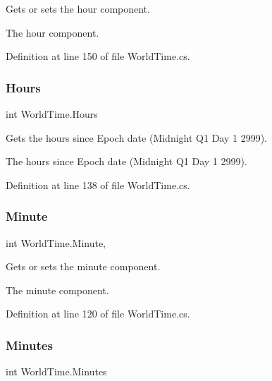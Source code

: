 Gets or sets the hour component. 

The hour component.

Definition at line 150 of file World\+Time.\+cs.

\mbox{\label{struct_world_time_aa9214bdaacba28828afdc8cfb904fc9d}} 
\subsubsection{\texorpdfstring{Hours}{Hours}}
{\footnotesize\ttfamily int World\+Time.\+Hours\hspace{0.3cm}{\ttfamily [get]}}



Gets the hours since Epoch date (Midnight Q1 Day 1 2999). 

The hours since Epoch date (Midnight Q1 Day 1 2999).

Definition at line 138 of file World\+Time.\+cs.

\mbox{\label{struct_world_time_ad318657e893a0beb7047b93a8984e574}} 
\subsubsection{\texorpdfstring{Minute}{Minute}}
{\footnotesize\ttfamily int World\+Time.\+Minute\hspace{0.3cm}{\ttfamily [get]}, {\ttfamily [set]}}



Gets or sets the minute component. 

The minute component.

Definition at line 120 of file World\+Time.\+cs.

\mbox{\label{struct_world_time_abf67c1e98387182e7e776e8e86be0065}} 
\subsubsection{\texorpdfstring{Minutes}{Minutes}}
{\footnotesize\ttfamily int World\+Time.\+Minutes\hspace{0.3cm}{\ttfamily [get]}}



